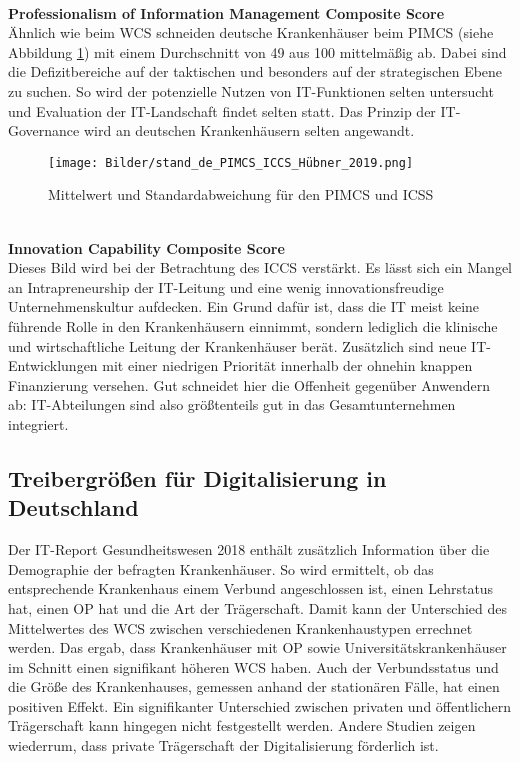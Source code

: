 \vspace{\parheadvspace}\\
\textbf{Professionalism of Information Management Composite Score}\\
Ähnlich wie beim WCS schneiden deutsche Krankenhäuser beim PIMCS (siehe Abbildung \ref{fig:stand_de_PIMCS_ICCS}) mit einem Durchschnitt von 49 aus 100 mittelmäßig ab. Dabei sind die Defizitbereiche auf der taktischen und besonders auf der strategischen Ebene zu suchen. So wird der potenzielle Nutzen von IT-Funktionen selten untersucht und Evaluation der IT-Landschaft findet selten statt. Das Prinzip der IT-Governance wird an deutschen Krankenhäusern selten angewandt.
\begin{figure}[ht]
	\centering
	\texttt{[image: Bilder/stand\_de\_PIMCS\_ICCS\_Hübner\_2019.png]}
	\caption{Mittelwert und Standardabweichung für den PIMCS und ICSS \parencite{huebner2019}}
	\label{fig:stand_de_PIMCS_ICCS}
\end{figure}
\vspace{\parheadvspace}\\
\textbf{Innovation Capability Composite Score}\\
Dieses Bild wird bei der Betrachtung des ICCS verstärkt. Es lässt sich ein Mangel an Intrapreneurship der IT-Leitung und eine wenig innovationsfreudige Unternehmenskultur aufdecken. Ein Grund dafür ist, dass die IT meist keine führende Rolle in den Krankenhäusern einnimmt, sondern lediglich die klinische und wirtschaftliche Leitung der Krankenhäuser berät. Zusätzlich sind neue IT-Entwicklungen mit einer niedrigen Priorität innerhalb der ohnehin knappen Finanzierung versehen. Gut schneidet hier die Offenheit gegenüber Anwendern ab: IT-Abteilungen sind also größtenteils gut in das Gesamtunternehmen integriert.

\subsection{Treibergrößen für Digitalisierung in Deutschland}
Der IT-Report Gesundheitswesen 2018 enthält zusätzlich Information über die Demographie der befragten Krankenhäuser. So wird ermittelt, ob das entsprechende Krankenhaus einem Verbund angeschlossen ist, einen Lehrstatus hat, einen OP hat und die Art der Trägerschaft. Damit kann der Unterschied des Mittelwertes des WCS zwischen verschiedenen Krankenhaustypen errechnet werden. Das ergab, dass Krankenhäuser mit OP sowie Universitätskrankenhäuser im Schnitt einen signifikant höheren WCS haben. Auch der Verbundsstatus und die Größe des Krankenhauses, gemessen anhand der stationären Fälle, hat einen positiven Effekt. \parencite{huebner2019}
Ein signifikanter Unterschied zwischen privaten und öffentlichern Trägerschaft kann hingegen nicht festgestellt werden. Andere Studien \parencite{cresswell2013} zeigen wiederrum, dass private Trägerschaft der Digitalisierung förderlich ist.\\

